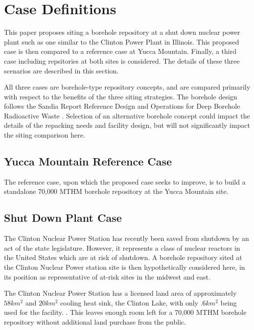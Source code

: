 
\section{Case Definitions}

This paper proposes siting a borehole
 repository at a shut down nuclear power plant such as one similar to the 
 Clinton Power Plant in Illinois. This proposed case is then compared to a 
 reference case at Yucca Mountain. Finally, a third case including repsitories 
 at both sites is considered.  The details of these three scenarios are described in this section.

 All three cases are borehole-type repository concepts, and are compared 
 primarily with respect to the benefits of the three siting strategies.
The borehole design follows the Sandia Report Reference Design and Operations 
for Deep Borehole Radioactive Waste \cite{arnold_reference_2011}. Selection of 
an alternative borehole concept could impact the details of the repacking needs 
and facility design, but will not significantly impact the siting comparison 
here.
 
\subsection{Yucca Mountain Reference Case} 
The reference case, upon which the proposed case seeks to improve, is to build 
a standalone 70,000 \gls{MTHM} borehole repository at the Yucca Mountain site.

\subsection{Shut Down Plant Case}

The Clinton Nuclear Power Station has recently been saved from shutdown by an 
act of the state legislature. However, it represents a class of nuclear 
reactors in the United States which are at risk of shutdown. A borehole repository 
sited at the Clinton Nuclear Power station site is then hypothetically 
considered here, in its position as representative of at-risk sites in the 
midwest and east.

The Clinton Nuclear Power Station has a licensed land area of approximately $58km^2$ and $20km^2$
 cooling heat sink, the Clinton Lake, with only $.6km^2$ being used for the facility.
  \cite{NRC_Clinton}.  This leaves enough room left for a 70,000 \gls{MTHM} borehole
  repository without additional land purchase from the public.


